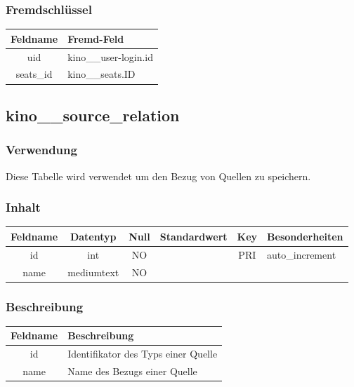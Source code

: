 \subsubsection{Fremdschlüssel}
\begin{table}[H]
	\begin{tabular}{|c|p{12.5cm}|}
		\hline
		\textbf{Feldname} & \textbf{Fremd-Feld} \\ \hline
		uid & kino\_\_user-login.id \\ \hline
		seats\_id & kino\_\_seats.ID \\ \hline
	\end{tabular}
\end{table}
\subsection{kino\_\_source\_relation}
\subsubsection{Verwendung} Diese Tabelle wird verwendet um den Bezug von Quellen zu speichern.
\subsubsection{Inhalt}
\begin{table}[H]
	\begin{tabular}{|c|c|c|c|c|p{3.5cm}|}
		\hline
		\textbf{Feldname} & \textbf{Datentyp} & \textbf{Null} & \textbf{Standardwert} & \textbf{Key}   & \textbf{Besonderheiten} \\ \hline
		id & int & NO &  & PRI & auto\_increment \\ \hline
		name & mediumtext & NO &  &  & \\ \hline
	\end{tabular}
\end{table}
\subsubsection{Beschreibung}
\begin{table}[H]
	\begin{tabular}{|c|p{12cm}|}
		\hline
		\textbf{Feldname} & \textbf{Beschreibung} \\ \hline
		id & Identifikator des Typs einer Quelle \\ \hline
		name & Name des Bezugs einer Quelle \\ \hline
	\end{tabular}
\end{table}
